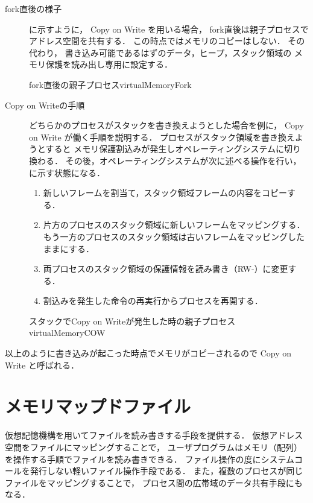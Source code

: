 \begin{description}
\item[fork直後の様子]
  に示すように，
  Copy on Write を用いる場合，
  fork直後は親子プロセスでアドレス空間を共有する．
  この時点ではメモリのコピーはしない．
  その代わり，
  書き込み可能であるはずのデータ，ヒープ，スタック領域の
  メモリ保護を読み出し専用に設定する．

           {fork直後の親子プロセス}{virtualMemoryFork}

\item[Copy on Writeの手順]
  どちらかのプロセスがスタックを書き換えようとした場合を例に，
  Copy on Write が働く手順を説明する．
  プロセスがスタック領域を書き換えようとすると
  メモリ保護割込みが発生しオペレーティングシステムに切り換わる．
  その後，オペレーティングシステムが次に述べる操作を行い，
  に示す状態になる．

  \begin{enumerate}
  \item 新しいフレームを割当て，スタック領域フレームの内容をコピーする．
  \item 片方のプロセスのスタック領域に新しいフレームをマッピングする．
    もう一方のプロセスのスタック領域は古いフレームをマッピングしたままにする．
  \item 両プロセスのスタック領域の保護情報を読み書き（RW-）に変更する．
  \item 割込みを発生した命令の再実行からプロセスを再開する．
  \end{enumerate}

      {スタックでCopy on Writeが発生した時の親子プロセス}{virtualMemoryCOW}
\end{description}

以上のように書き込みが起こった時点でメモリがコピーされるので
Copy on Write と呼ばれる．

\section{メモリマップドファイル}
仮想記憶機構を用いてファイルを読み書きする手段を提供する．
仮想アドレス空間をファイルにマッピングすることで，
ユーザプログラムはメモリ（配列）を操作する手順でファイルを読み書きできる．
ファイル操作の度にシステムコールを発行しない軽いファイル操作手段である．
また，複数のプロセスが同じファイルをマッピングすることで，
プロセス間の広帯域のデータ共有手段にもなる．

